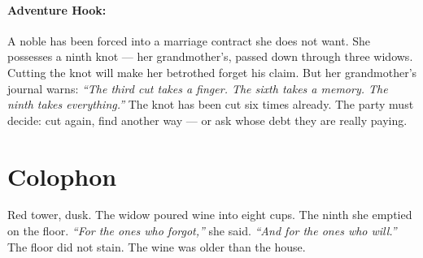\paragraph{Adventure Hook:}
A noble has been forced into a marriage contract she does not want. She possesses a ninth knot — her grandmother's, passed down through three widows. Cutting the knot will make her betrothed forget his claim. But her grandmother's journal warns: \textit{``The third cut takes a finger. The sixth takes a memory. The ninth takes everything.''} The knot has been cut six times already. The party must decide: cut again, find another way — or ask whose debt they are really paying.

\section*{Colophon}
Red tower, dusk. The widow poured wine into eight cups. The ninth she emptied on the floor. \textit{``For the ones who forgot,''} she said. \textit{``And for the ones who will.''} The floor did not stain. The wine was older than the house.
